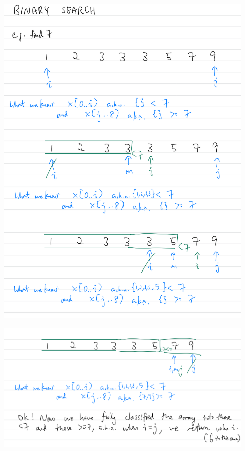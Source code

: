 \includegraphics[width=12.5cm]{images/ch7-binarysearch71.png}

\includegraphics[width=12.5cm]{images/ch7-binarysearch72.png}

